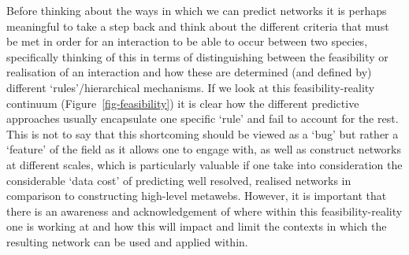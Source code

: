\documentclass[
]{article}
\begin{document}
\begin{tcolorbox}[enhanced jigsaw, rightrule=.15mm, colback=white, coltitle=black, colbacktitle=quarto-callout-note-color!10!white, leftrule=.75mm, title=\textcolor{quarto-callout-note-color}{\faInfo}\hspace{0.5em}{Box 1 - Moving between the feasibility and reality of interactions}, bottomrule=.15mm, colframe=quarto-callout-note-color-frame, titlerule=0mm, arc=.35mm, toptitle=1mm, opacitybacktitle=0.6, breakable, opacityback=0, toprule=.15mm, left=2mm, bottomtitle=1mm]

Before thinking about the ways in which we can predict networks it is
perhaps meaningful to take a step back and think about the different
criteria that must be met in order for an interaction to be able to
occur between two species, specifically thinking of this in terms of
distinguishing between the feasibility or realisation of an interaction
and how these are determined (and defined by) different
`rules'/hierarchical mechanisms. If we look at this feasibility-reality
continuum (Figure~\ref{fig-feasibility}) it is clear how the different
predictive approaches usually encapsulate one specific `rule' and fail
to account for the rest. This is not to say that this shortcoming should
be viewed as a `bug' but rather a `feature' of the field as it allows
one to engage with, as well as construct networks at different scales,
which is particularly valuable if one take into consideration the
considerable `data cost' of predicting well resolved, realised networks
in comparison to constructing high-level metawebs. However, it is
important that there is an awareness and acknowledgement of where within
this feasibility-reality one is working at and how this will impact and
limit the contexts in which the resulting network can be used and
applied within.

\begin{figure}[H]

\centering{

}
\end{figure}
\end{tcolorbox}
\end{document}
